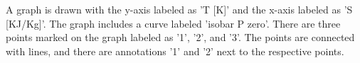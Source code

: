 A graph is drawn with the y-axis labeled as 'T [K]' and the x-axis labeled as 'S [KJ/Kg]'. The graph includes a curve labeled 'isobar P zero'. There are three points marked on the graph labeled as '1', '2', and '3'. The points are connected with lines, and there are annotations '1' and '2' next to the respective points.